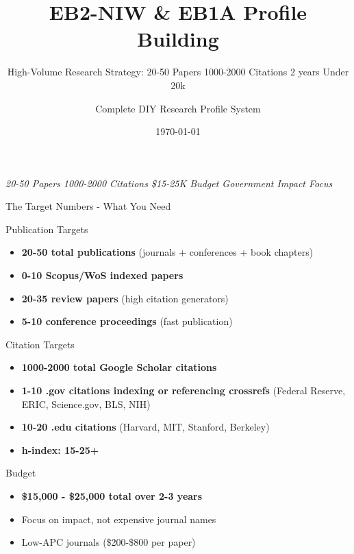 \documentclass[11pt]{beamer}
\title{EB2-NIW \& EB1A Profile Building}
\subtitle{High-Volume Research Strategy: 20-50 Papers  1000-2000 Citations 2 years Under 20k}
\author{Complete DIY Research Profile System}
\date{\today}
\begin{document}
	
	\begin{frame}
		\titlepage
		\centering
		\scriptsize \textit{20-50 Papers  1000-2000 Citations   \$15-25K Budget   Government Impact Focus}
	\end{frame}
	
	\begin{frame}{The Target Numbers - What You Need}
		\scriptsize
		\begin{block}{Publication Targets}
			\begin{itemize}
				\item \textbf{20-50 total publications} (journals + conferences + book chapters)
				\item \textbf{0-10 Scopus/WoS indexed papers}
				\item \textbf{20-35 review papers} (high citation generators)
				\item \textbf{5-10 conference proceedings} (fast publication)
			\end{itemize}
		\end{block}
		\begin{block}{Citation Targets}
			\begin{itemize}
				\item \textbf{1000-2000 total Google Scholar citations}
				\item \textbf{1-10 .gov citations indexing or referencing crossrefs} (Federal Reserve, ERIC, Science.gov, BLS, NIH)
				\item \textbf{10-20 .edu citations} (Harvard, MIT, Stanford, Berkeley)
				\item \textbf{h-index: 15-25+}
			\end{itemize}
		\end{block}
		\begin{block}{Budget}
			\begin{itemize}
				\item \textbf{\$15,000 - \$25,000 total over 2-3 years}
				\item Focus on impact, not expensive journal names
				\item Low-APC journals (\$200-\$800 per paper)
			\end{itemize}
		\end{block}
	\end{frame}
	
\end{document}
